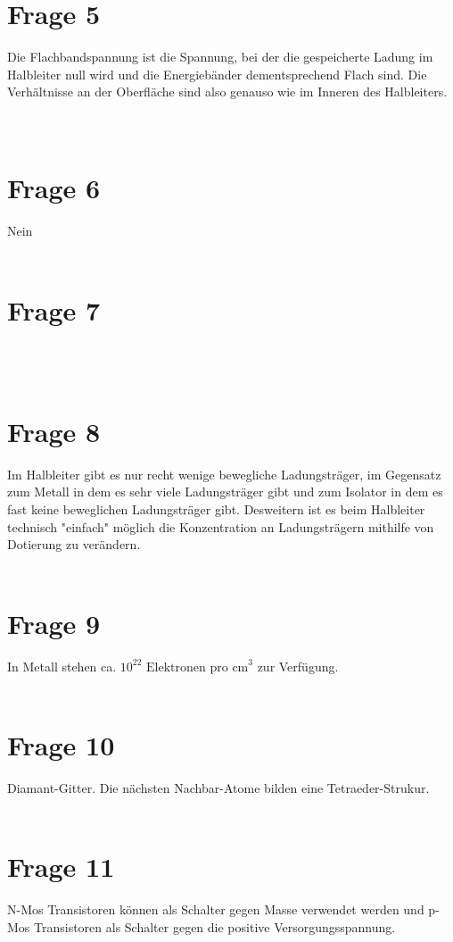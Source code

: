 \documentclass[a4paper]{scrartcl}
\begin{document}
\section*{Frage 5}
Die Flachbandspannung ist die Spannung, bei der die gespeicherte Ladung im Halbleiter null wird und die Energiebänder dementsprechend Flach sind. Die Verhältnisse an der Oberfläche sind also genauso wie im Inneren des Halbleiters.
~\\
~\\
\section*{Frage 6}
Nein
~\\
~\\
\section*{Frage 7}

~\\
~\\
\section*{Frage 8}
Im Halbleiter gibt es nur recht wenige bewegliche Ladungsträger, im Gegensatz zum Metall in dem es sehr viele Ladungsträger gibt und zum Isolator in dem es fast keine beweglichen Ladungsträger gibt. Desweitern ist es beim Halbleiter technisch "einfach" möglich die Konzentration an Ladungsträgern mithilfe von Dotierung zu verändern.
~\\
~\\
\section*{Frage 9}
In Metall stehen ca. $10^{22} \text{ Elektronen pro cm}^3$ zur Verfügung.
~\\
~\\
\section*{Frage 10}
Diamant-Gitter. Die nächsten Nachbar-Atome bilden eine Tetraeder-Strukur.
~\\
~\\
\section*{Frage 11}
N-Mos Transistoren können als Schalter gegen Masse verwendet werden und p-Mos Transistoren als Schalter gegen die positive Versorgungsspannung.
~\\
~\\
\end{document}
